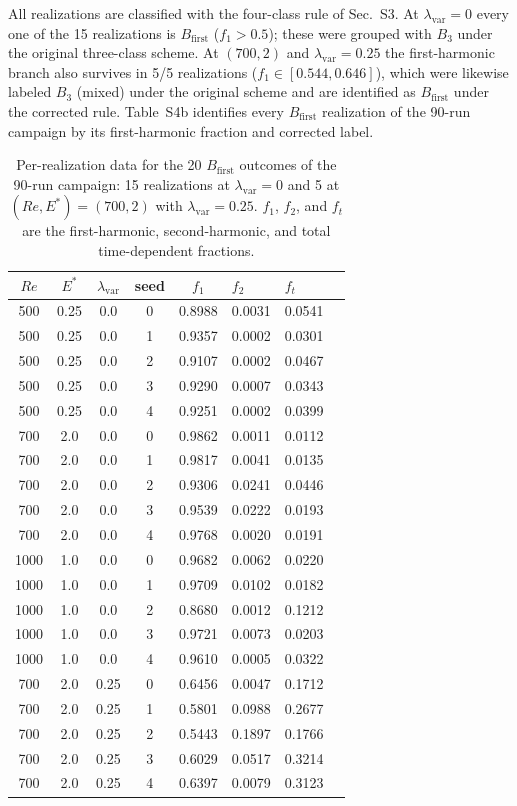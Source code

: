 \documentclass[11pt]{article}
\begin{document}
All realizations are classified with the four-class rule of Sec.~S3. At
$\lambda_{\mathrm{var}}=0$ every one of the 15 realizations is
$B_{\mathrm{first}}$ ($f_1>0.5$); these were grouped with $B_3$ under the
original three-class scheme. At $(700,2)$ and $\lambda_{\mathrm{var}}=0.25$ the
first-harmonic branch also survives in 5/5 realizations
($f_1\in[0.544,0.646]$), which were likewise labeled $B_3$ (mixed) under the
original scheme and are identified as $B_{\mathrm{first}}$ under the corrected
rule. Table~S4b identifies every $B_{\mathrm{first}}$ realization of the 90-run
campaign by its first-harmonic fraction and corrected label.

\begin{table}[h]
\centering\small
\caption{Per-realization data for the 20 $B_{\mathrm{first}}$ outcomes of the
90-run campaign: 15 realizations at $\lambda_{\mathrm{var}}=0$ and 5 at
$(Re,E^*)=(700,2)$ with $\lambda_{\mathrm{var}}=0.25$. $f_1$, $f_2$, and $f_t$
are the first-harmonic, second-harmonic, and total time-dependent fractions.}
\label{tab:S4b}
\begin{tabular}{ccccclll}
\toprule
$Re$ & $E^*$ & $\lambda_{\mathrm{var}}$ & seed & $f_1$ & $f_2$ & $f_t$\\
\midrule
500 & 0.25 & 0.0 & 0 & 0.8988 & 0.0031 & 0.0541\\
500 & 0.25 & 0.0 & 1 & 0.9357 & 0.0002 & 0.0301\\
500 & 0.25 & 0.0 & 2 & 0.9107 & 0.0002 & 0.0467\\
500 & 0.25 & 0.0 & 3 & 0.9290 & 0.0007 & 0.0343\\
500 & 0.25 & 0.0 & 4 & 0.9251 & 0.0002 & 0.0399\\
700 & 2.0  & 0.0 & 0 & 0.9862 & 0.0011 & 0.0112\\
700 & 2.0  & 0.0 & 1 & 0.9817 & 0.0041 & 0.0135\\
700 & 2.0  & 0.0 & 2 & 0.9306 & 0.0241 & 0.0446\\
700 & 2.0  & 0.0 & 3 & 0.9539 & 0.0222 & 0.0193\\
700 & 2.0  & 0.0 & 4 & 0.9768 & 0.0020 & 0.0191\\
1000 & 1.0 & 0.0 & 0 & 0.9682 & 0.0062 & 0.0220\\
1000 & 1.0 & 0.0 & 1 & 0.9709 & 0.0102 & 0.0182\\
1000 & 1.0 & 0.0 & 2 & 0.8680 & 0.0012 & 0.1212\\
1000 & 1.0 & 0.0 & 3 & 0.9721 & 0.0073 & 0.0203\\
1000 & 1.0 & 0.0 & 4 & 0.9610 & 0.0005 & 0.0322\\
700 & 2.0  & 0.25 & 0 & 0.6456 & 0.0047 & 0.1712\\
700 & 2.0  & 0.25 & 1 & 0.5801 & 0.0988 & 0.2677\\
700 & 2.0  & 0.25 & 2 & 0.5443 & 0.1897 & 0.1766\\
700 & 2.0  & 0.25 & 3 & 0.6029 & 0.0517 & 0.3214\\
700 & 2.0  & 0.25 & 4 & 0.6397 & 0.0079 & 0.3123\\
\bottomrule
\end{tabular}
\end{table}
\end{document}
